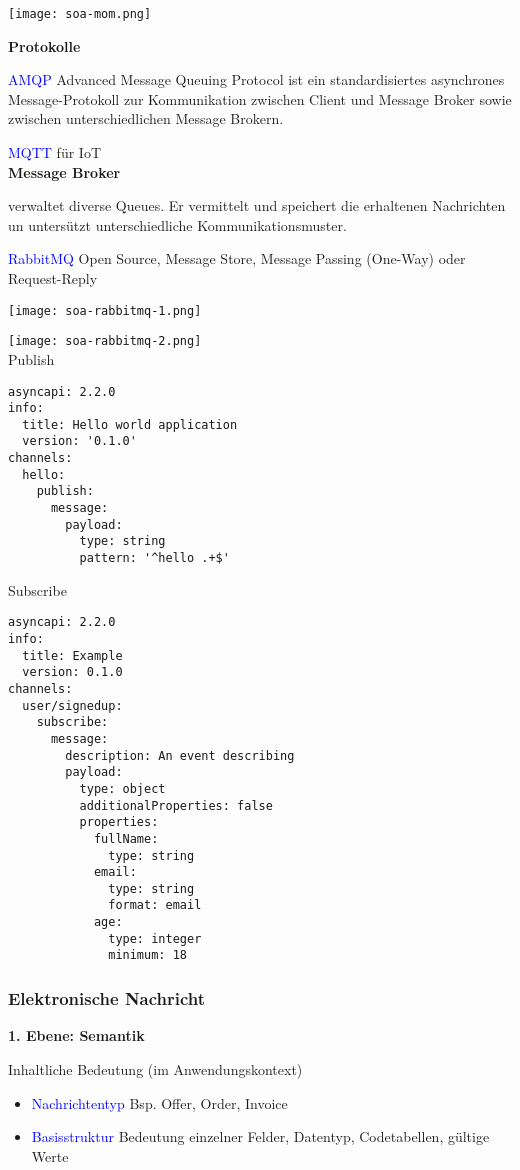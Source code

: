 \texttt{[image: soa-mom.png]}

\textbf{Protokolle}

\textcolor{blue}{AMQP} Advanced Message Queuing Protocol ist ein standardisiertes asynchrones Message-Protokoll zur Kommunikation zwischen Client und Message Broker sowie zwischen unterschiedlichen Message Brokern.

\textcolor{blue}{MQTT} für IoT \\

\textbf{Message Broker}

verwaltet diverse Queues. Er vermittelt und speichert die erhaltenen Nachrichten un untersützt unterschiedliche Kommunikationsmuster.

\textcolor{blue}{RabbitMQ} Open Source, Message Store, Message Passing (One-Way) oder Request-Reply

\texttt{[image: soa-rabbitmq-1.png]}

\texttt{[image: soa-rabbitmq-2.png]} \\

Publish
\begin{lstlisting}
asyncapi: 2.2.0
info:
  title: Hello world application
  version: '0.1.0'
channels:
  hello:
    publish:
      message:
        payload:
          type: string
          pattern: '^hello .+$'
\end{lstlisting}
\vspace{10pt}
\columnbreak
Subscribe
\begin{lstlisting}
asyncapi: 2.2.0
info:
  title: Example
  version: 0.1.0
channels:
  user/signedup:
    subscribe:
      message:
        description: An event describing
        payload:
          type: object
          additionalProperties: false
          properties:
            fullName:
              type: string
            email:
              type: string
              format: email
            age:
              type: integer
              minimum: 18
\end{lstlisting}

\subsubsection{Elektronische Nachricht}

\textbf{1. Ebene: Semantik}

Inhaltliche Bedeutung (im Anwendungskontext)

\begin{itemize}
    \item \textcolor{blue}{Nachrichtentyp} Bsp. Offer, Order, Invoice
    \item \textcolor{blue}{Basisstruktur} Bedeutung einzelner Felder, Datentyp, Codetabellen, gültige Werte
\end{itemize}

